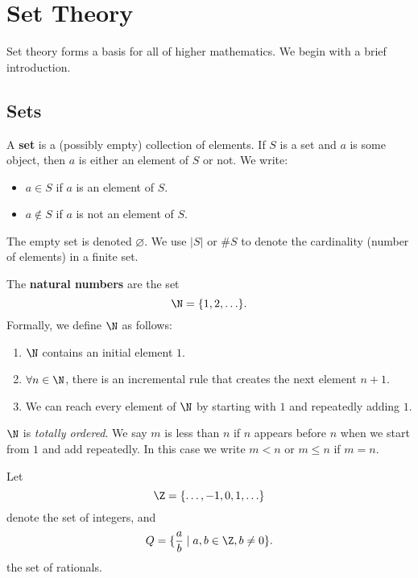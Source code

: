 \documentclass[math1530-lecture-notes.tex]{subfiles}
\begin{document}
\chapter{Set Theory}

Set theory forms a basis for all of higher mathematics. We begin with a brief introduction.

\section{Sets}

\begin{definition}[Sets]{}
  A \textbf{set} is a (possibly empty) collection of elements. If $S$ is a set and $a$ is
  some object, then $a$ is either an element of $S$ or not. We write:
  \begin{itemize}
    \item $a\in S$ if $a$ is an element of $S$.
    \item $a\not\in S$ if $a$ is not an element of $S$.
  \end{itemize}
\end{definition}
The empty set is denoted $\varnothing$. We use $\left| S \right| $ or $\#S$ to denote the cardinality (number of
elements) in a finite set.

\begin{definition}{}
  The \textbf{natural numbers} are the set \[
  \N = \{1, 2, \ldots\} 
  .\] 
  Formally, we define $\N$ as follows:
  \begin{enumerate}
    \item $ \N$ contains an initial element $1$.
    \item $ \forall n\in \N$, there is an incremental rule that creates the next element $n+1$.
    \item We can reach every element of $ \N$ by starting with $1$ and repeatedly adding $1$.
  \end{enumerate}
\end{definition}

\begin{remark}
  $ \N$ is \textit{totally ordered}. We say $m$ is less than $n$ if $n$ appears before $n$ when we
  start from $1$ and add repeatedly. In this case we write $m<n$ or $m\le n$ if $m=n$.
\end{remark}

\begin{example}
  Let \[\Z = \{\ldots, -1, 0, 1, \ldots\}\] denote the set of integers, and \[
  Q = \{\frac{a}{b}\mid a,b\in \Z, b\neq 0\} 
  .\] the set of rationals.
\end{example}
\end{document}
